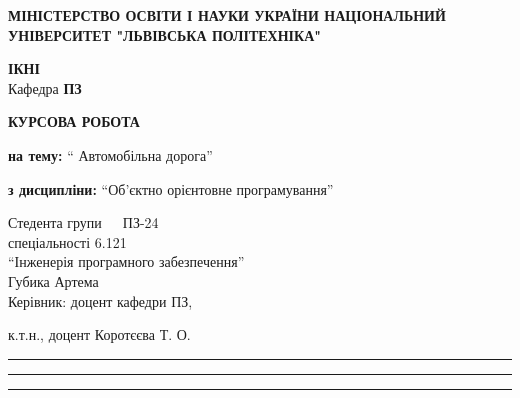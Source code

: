 \documentclass[14pt]{extarticle}
\begin{document}
\begin{titlepage}
    \begin{center}
        \textbf{\normalsize{\MakeUppercase{
            Міністерство Освіти і науки України
            Національний університет "Львівська політехніка"
        }}}

        \begin{flushright}
        \textbf{ІКНІ}\\
        Кафедра \textbf{ПЗ}
        \end{flushright}
        \vspace{15mm}


        \vspace*{\fill}

        \textbf{\normalsize{\MakeUppercase{Курсова Робота}}}
            

        \textbf{на тему:} “ Автомобільна дорога”

        \textbf{з дисципліни:} “Об'єктно орієнтовне програмування”
            
        \vspace*{\fill}

        \begin{flushright}

            Стедента групи   ПЗ-24\\

            \vspace*{12pt}
            спеціальності 6.121\\

            \vspace*{12pt}
            “Інженерія програмного забезпечення”\\

            \vspace*{12pt}
            Губика Артема\\

            \vspace*{12pt}
            Керівник: доцент кафедри ПЗ,

            \vspace*{12pt}
            к.т.н., доцент Коротєєва Т. О.

            \vspace*{12pt}
            \rule{3cm Національна шкала\space}{0.3pt} 

            \vspace*{12pt}
            \rule{0.40cm Кількість балів\space}{0.3pt} 
            \rule{0.4cm Оцінка ECTS\space}{0.3pt} 


\end{flushright}
\end{center}
\end{titlepage}
\end{document}
